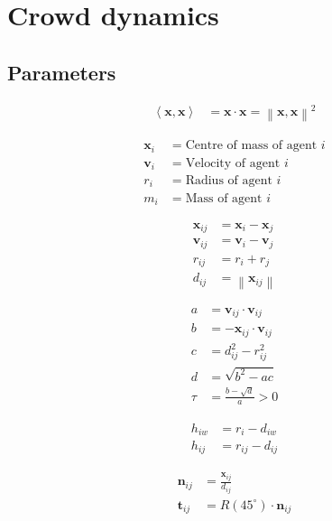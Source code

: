 \section{Crowd dynamics}
\subsection{Parameters}

\begin{align}
\left\langle \mathbf{x}, \mathbf{x} \right\rangle &= \mathbf{x} \cdot \mathbf{x} = \left\| \mathbf{x}, \mathbf{x} \right\|^{2}
\end{align}

\begin{align}
\mathbf{x}_{i} &= \text{Centre of mass of agent } i \\
\mathbf{v}_{i} &= \text{Velocity of agent } i \\
r_{i} &= \text{Radius of agent } i \\
m_{i} &= \text{Mass of agent } i
\end{align}

\begin{align}
\mathbf{x}_{ij} &= \mathbf{x}_{i} - \mathbf{x}_{j} \\
\mathbf{v}_{ij} &= \mathbf{v}_{i} - \mathbf{v}_{j} \\
r_{ij} &= r_{i} + r_{j} \\
d_{ij} &= \left\|\mathbf{x}_{ij}\right\|
\end{align}

\begin{align}
a &= \mathbf{v}_{ij} \cdot \mathbf{v}_{ij} \\
b &= -\mathbf{x}_{ij} \cdot \mathbf{v}_{ij} \\
c &= d_{ij}^{2} - r_{ij}^{2} \\
d &= \sqrt{b^{2} - a c} \\
\tau &= \frac{b - \sqrt{d}}{a} > 0
\end{align}

\begin{align}
h_{iw} &= r_{i} - d_{iw} \\
h_{ij} &= r_{ij} - d_{ij}
\end{align}

\begin{align}
\mathbf{n}_{ij} &= \frac{\mathbf{x}_{ij}}{d_{ij}} \\
\mathbf{t}_{ij} &= R(45^{\circ}) \cdot \mathbf{n}_{ij} \\
\end{align}

